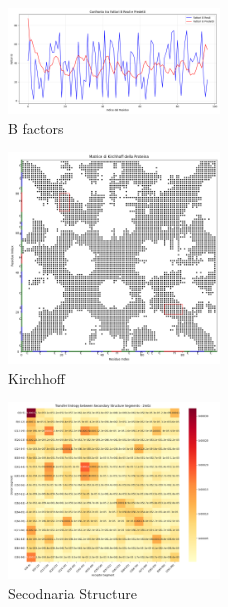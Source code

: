 \documentclass[Lau,binding=0.6cm,oneside,noexaminfo]{sapthesis}
\begin{document}
\begin{figure}[H]
    \centering
    \includegraphics[width=0.5\textwidth]{"images/2m0zConfronto tra Fattori B Reali e Predetti.png"}
    \caption{B factors}
\end{figure}
\begin{figure}[H]
    \centering
    \includegraphics[width=0.5\textwidth]{"images/2m0z_Matrice di Kirchhoff della Proteina.png"}
    \caption{Kirchhoff}
\end{figure}
\begin{figure}[H]
    \centering
    \includegraphics[width=0.5\textwidth]{"images/2m0zanalyze_secondary_structure_transfer_entropy.png"}
    \caption{Secodnaria Structure}
\end{figure}
\end{document}
